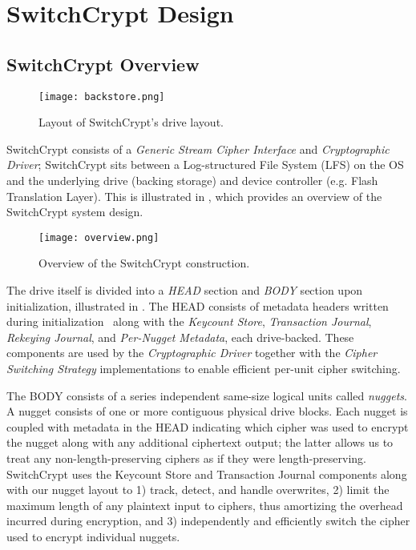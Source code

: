 \section{SwitchCrypt Design} \label{sec:design}

\subsection{SwitchCrypt Overview} \label{subsec:overview}

\begin{figure}[t]
   \centering
   \texttt{[image: backstore.png]}
   \caption{Layout of SwitchCrypt's drive layout.}\label{fig:backstore}
\end{figure}

SwitchCrypt consists of a \emph{Generic Stream Cipher Interface} and
\emph{Cryptographic Driver}; SwitchCrypt sits between a Log-structured File
System (LFS) on the OS and the underlying drive (backing storage) and device
controller (e.g. Flash Translation Layer). This is illustrated in
, which provides an overview of the SwitchCrypt system design.

\begin{figure}[ht]
   \centering
   \texttt{[image: overview.png]}
   \caption{Overview of the SwitchCrypt construction.}\label{fig:overview}
\end{figure}

The drive itself is divided into a \emph{HEAD} section and \emph{BODY} section
upon initialization, illustrated in . The HEAD consists of
metadata headers written during initialization~\cite{StrongBox} along with the
\emph{Keycount Store}, \emph{Transaction Journal}, \emph{Rekeying Journal}, and
\emph{Per-Nugget Metadata}, each drive-backed. These components are used by the
\emph{Cryptographic Driver} together with the \emph{Cipher Switching Strategy}
implementations to enable efficient per-unit cipher switching.

The BODY consists of a series independent same-size logical units called
\emph{nuggets}. A nugget consists of one or more contiguous physical drive
blocks. Each nugget is coupled with metadata in the HEAD indicating which cipher
was used to encrypt the nugget along with any additional ciphertext output; the
latter allows us to treat any non-length-preserving ciphers as if they were
length-preserving. SwitchCrypt uses the Keycount Store and Transaction Journal
components along with our nugget layout to 1) track, detect, and handle
overwrites, 2) limit the maximum length of any plaintext input to ciphers, thus
amortizing the overhead incurred during encryption, and 3) independently and
efficiently switch the cipher used to encrypt individual nuggets.

